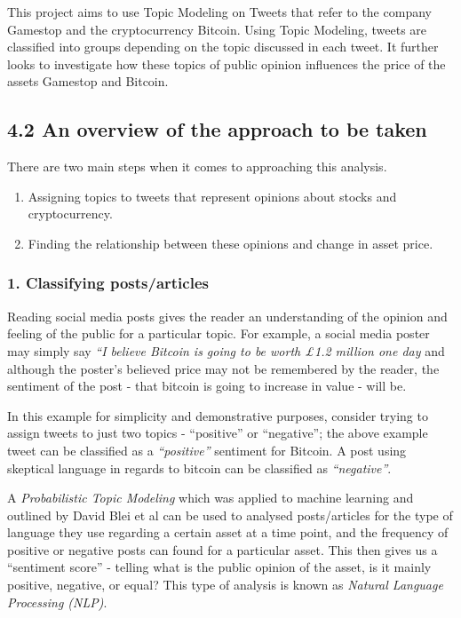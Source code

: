 \documentclass[
]{article}
\providecommand{\tightlist}{%
  \setlength{\itemsep}{0pt}\setlength{\parskip}{0pt}}
\begin{document}
This project aims to use Topic Modeling on Tweets that refer to the
company Gamestop and the cryptocurrency Bitcoin. Using Topic Modeling,
tweets are classified into groups depending on the topic discussed in
each tweet. It further looks to investigate how these topics of public
opinion influences the price of the assets Gamestop and Bitcoin.

\hypertarget{an-overview-of-the-approach-to-be-taken}{%
\subsection{4.2 An overview of the approach to be
taken}\label{an-overview-of-the-approach-to-be-taken}}

There are two main steps when it comes to approaching this analysis.

\begin{enumerate}
\def\labelenumi{\arabic{enumi}.}
\tightlist
\item
  Assigning topics to tweets that represent opinions about stocks and
  cryptocurrency.
\item
  Finding the relationship between these opinions and change in asset
  price.
\end{enumerate}

\hypertarget{classifying-postsarticles}{%
\subsubsection{1. Classifying
posts/articles}\label{classifying-postsarticles}}

Reading social media posts gives the reader an understanding of the
opinion and feeling of the public for a particular topic. For example, a
social media poster may simply say \emph{``I believe Bitcoin is going to
be worth £1.2 million one day} and although the poster's believed price
may not be remembered by the reader, the sentiment of the post - that
bitcoin is going to increase in value - will be.

In this example for simplicity and demonstrative purposes, consider
trying to assign tweets to just two topics - ``positive'' or
``negative''; the above example tweet can be classified as a
\emph{``positive''} sentiment for Bitcoin. A post using skeptical
language in regards to bitcoin can be classified as \emph{``negative''}.

A \emph{Probabilistic Topic Modeling} which was applied to machine
learning and outlined by David Blei et al can be used to analysed
posts/articles for the type of language they use regarding a certain
asset at a time point, and the frequency of positive or negative posts
can found for a particular asset. This then gives us a ``sentiment
score'' - telling what is the public opinion of the asset, is it mainly
positive, negative, or equal? This type of analysis is known as
\emph{Natural Language Processing (NLP)}.
\end{document}
